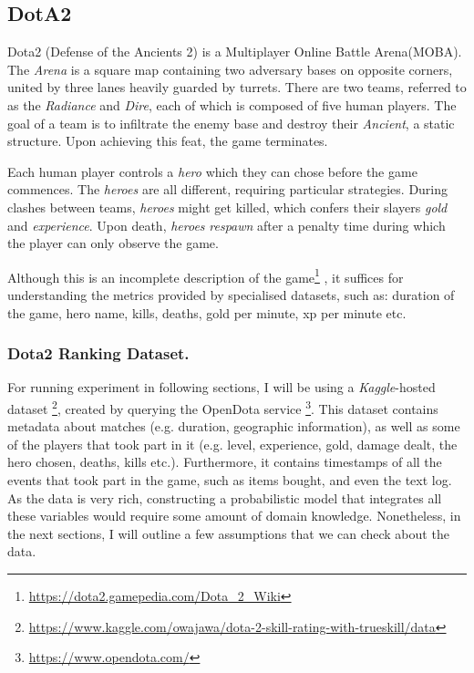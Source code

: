 \documentclass[10pt,a4]{article}
\begin{document}
\subsection{DotA2}

Dota2 (Defense of the Ancients 2) is a Multiplayer Online Battle Arena(MOBA). 
The \emph{Arena} is a square map 
containing two adversary bases on opposite corners, united by three lanes heavily
guarded by turrets. There are two teams, referred to as the \emph{Radiance} and \emph{Dire},
each of which is composed of five human players. The goal of a team is to infiltrate 
the enemy base and destroy their \emph{Ancient}, a static structure. Upon achieving
this feat, the game terminates.

Each human player controls a \emph{hero} which they can chose before the game commences.
The \emph{heroes} are all different, requiring particular strategies. During 
clashes between teams, \emph{heroes} might get killed, which confers their slayers
\emph{gold} and \emph{experience}. Upon death, \emph{heroes} \emph{respawn} after 
a penalty time during which the player can only observe the game. 

Although this is an incomplete description of the game\footnote{\url{https://dota2.gamepedia.com/Dota_2_Wiki}}
, it suffices for understanding the metrics provided by specialised datasets, such as: 
duration of the game, hero name, kills, deaths, gold per minute, xp per minute etc.

\subsubsection{Dota2 Ranking Dataset.}

For running experiment in following sections, I will be using a \emph{Kaggle}-hosted
dataset \footnote{\url{https://www.kaggle.com/owajawa/dota-2-skill-rating-with-trueskill/data}},
created by querying the OpenDota service \footnote{\url{https://www.opendota.com/}}.
This dataset contains metadata about matches (e.g. duration, geographic information),
as well as some of the players that took part in it (e.g. level, experience, 
gold, damage dealt, the hero chosen, deaths, kills etc.). Furthermore, it contains
timestamps of all the events that took part in the game, such as items bought, 
and even the text log. As the data is very rich, constructing a probabilistic model
that integrates all these variables would require some amount of domain knowledge. 
Nonetheless, in the next sections, I will outline a few assumptions that we can
check about the data. 
\end{document}
